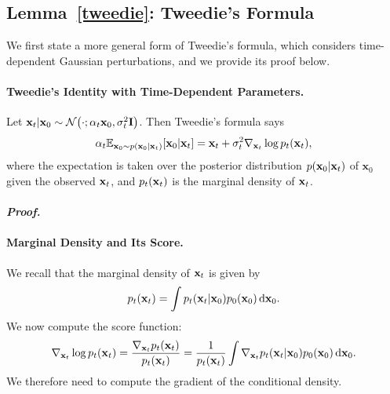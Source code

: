 \subsection{Lemma~\ref{tweedie}: Tweedie's Formula}\label{app-sec:tweedie}
We first state a more general form of Tweedie’s formula, which considers time-dependent Gaussian perturbations, and we provide its proof below.


\paragraph{Tweedie’s Identity with Time-Dependent Parameters.}
Let
${\mathbf{x}}_t|{\mathbf{x}}_0 \sim
\mathcal{N}\big(\cdot; \alpha_t{\mathbf{x}}_0, \sigma_t^2{\mathbf{I}}\big)$. Then Tweedie's formula says
\begin{align*}
\alpha_t \mathbb{E}_{\mathbf{x}_0 \sim p(\mathbf{x}_0|{\mathbf{x}}_t)}[\mathbf{x}_0|{\mathbf{x}}_t] = {\mathbf{x}}_t + \sigma_t^2 \nabla_{{\mathbf{x}}_t} \log p_t({\mathbf{x}}_t),
\end{align*}
where the expectation is taken over the posterior distribution $p(\mathbf{x}_0|{\mathbf{x}}_t)$ of $\mathbf{x}_0$ given the observed ${\mathbf{x}}_t$, and $p_t({\mathbf{x}}_t)$ is the marginal density of ${\mathbf{x}}_t$.


\paragraph{\textit{Proof.}}


\paragraph{Marginal Density and Its Score.}
We recall that the marginal density of ${\mathbf{x}}_t$ is given by
\begin{align*}
p_t({\mathbf{x}}_t) = \int p_t({\mathbf{x}}_t|{\mathbf{x}}_0)  p_0({\mathbf{x}}_0)  \mathop{}\!\mathrm{d}{\mathbf{x}}_0.
\end{align*}
We now compute the score function:
\begin{align*}
\nabla_{{\mathbf{x}}_t} \log p_t({\mathbf{x}}_t) 
= \frac{\nabla_{{\mathbf{x}}_t} p_t({\mathbf{x}}_t)}{p_t({\mathbf{x}}_t)} = \frac{1}{p_t({\mathbf{x}}_t)} \int \nabla_{{\mathbf{x}}_t} p_t({\mathbf{x}}_t|{\mathbf{x}}_0)  p_0({\mathbf{x}}_0)  \mathop{}\!\mathrm{d}{\mathbf{x}}_0.
\end{align*}
We therefore need to compute the gradient of the conditional density.

